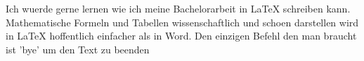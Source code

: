 
Ich wuerde gerne lernen wie ich meine Bachelorarbeit
in LaTeX schreiben kann. Mathematische Formeln und Tabellen wissenschaftlich und schoen darstellen wird in LaTeX hoffentlich einfacher als in Word. Den einzigen Befehl den man braucht ist 'bye' um den Text zu beenden
\bye
